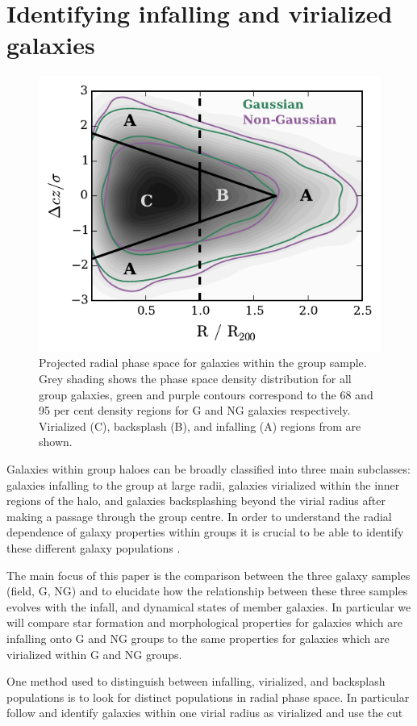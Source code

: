 \documentclass[a4paper,fleqn,usenatbib]{mnras}
\begin{document}

\section{Identifying infalling and virialized galaxies}
\label{sec:rad_div}

\begin{figure}
  \centering
  \includegraphics[width=\columnwidth]{vnorm_r_con.pdf}
  \caption{Projected radial phase space
    for galaxies within the group sample.  Grey shading shows the phase
    space density distribution for all group galaxies, green and
    purple contours correspond to the 68 and 95 per cent density
    regions for G and NG galaxies respectively. Virialized (C),
    backsplash (B), and infalling (A) regions from
    \citet{mahajan2011} are shown.}
  \label{fig:vnorm_r}
\end{figure}

Galaxies within group haloes can be broadly classified into three main
subclasses: galaxies infalling to the group at large radii, galaxies
virialized within the inner regions of the halo, and galaxies
backsplashing beyond the virial radius after making a passage through
the group centre.  In order to understand the radial dependence of
galaxy properties within groups it is crucial to be able to
identify these different galaxy populations
\citep{gill2005, mahajan2011, pimbblet2011, haines2015, noble2016}.
\par
The main focus of this paper is the comparison between the three
galaxy samples (field, G, NG) and to elucidate how the relationship
between these three samples evolves with the infall, and dynamical
states of member
galaxies.  In particular we will compare star formation and
morphological properties for galaxies which are infalling onto G and
NG groups to the same properties for galaxies which are virialized
within G and NG groups.
\par
One method used to distinguish between infalling, virialized, and
backsplash populations is to look for distinct populations in radial
phase space.  In particular \citet{mahajan2011} follow
\citet{sanchis2004} and identify galaxies within one virial radius as
virialized and use the cut
\end{document}
